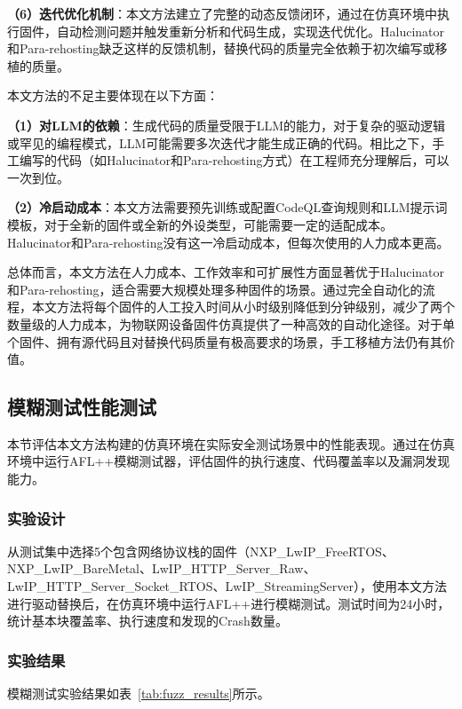\textbf{（6）迭代优化机制}：本文方法建立了完整的动态反馈闭环，通过在仿真环境中执行固件，自动检测问题并触发重新分析和代码生成，实现迭代优化。Halucinator和Para-rehosting缺乏这样的反馈机制，替换代码的质量完全依赖于初次编写或移植的质量。

本文方法的不足主要体现在以下方面：

\textbf{（1）对LLM的依赖}：生成代码的质量受限于LLM的能力，对于复杂的驱动逻辑或罕见的编程模式，LLM可能需要多次迭代才能生成正确的代码。相比之下，手工编写的代码（如Halucinator和Para-rehosting方式）在工程师充分理解后，可以一次到位。

\textbf{（2）冷启动成本}：本文方法需要预先训练或配置CodeQL查询规则和LLM提示词模板，对于全新的固件或全新的外设类型，可能需要一定的适配成本。Halucinator和Para-rehosting没有这一冷启动成本，但每次使用的人力成本更高。

总体而言，本文方法在人力成本、工作效率和可扩展性方面显著优于Halucinator和Para-rehosting，适合需要大规模处理多种固件的场景。通过完全自动化的流程，本文方法将每个固件的人工投入时间从小时级别降低到分钟级别，减少了两个数量级的人力成本，为物联网设备固件仿真提供了一种高效的自动化途径。对于单个固件、拥有源代码且对替换代码质量有极高要求的场景，手工移植方法仍有其价值。

\subsection{模糊测试性能测试}

本节评估本文方法构建的仿真环境在实际安全测试场景中的性能表现。通过在仿真环境中运行AFL++模糊测试器，评估固件的执行速度、代码覆盖率以及漏洞发现能力。

\subsubsection{实验设计}

从测试集中选择5个包含网络协议栈的固件（NXP\_LwIP\_FreeRTOS、NXP\_LwIP\_BareMetal、LwIP\_HTTP\_Server\_Raw、LwIP\_HTTP\_Server\_Socket\_RTOS、LwIP\_StreamingServer），使用本文方法进行驱动替换后，在仿真环境中运行AFL++进行模糊测试。测试时间为24小时，统计基本块覆盖率、执行速度和发现的Crash数量。

\subsubsection{实验结果}

模糊测试实验结果如表~\ref{tab:fuzz_results}所示。

